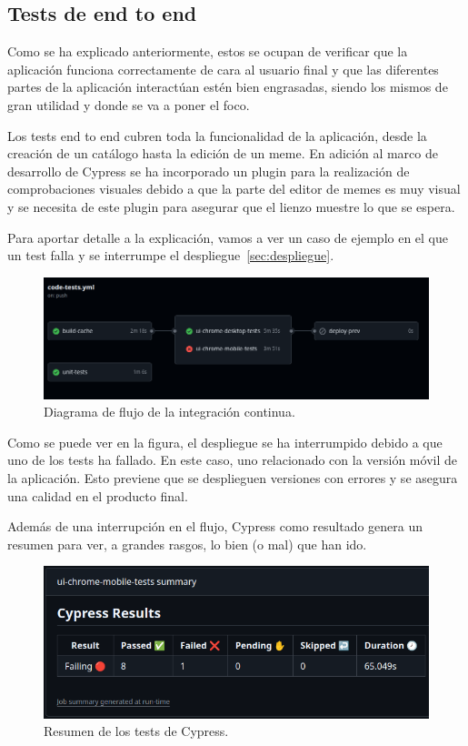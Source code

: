 \subsection{Tests de end to end}

Como se ha explicado anteriormente, estos se ocupan de verificar que la aplicación funciona correctamente de cara al usuario final y que las diferentes partes de la aplicación interactúan estén bien engrasadas, siendo los mismos de gran utilidad y donde se va a poner el foco.

Los tests end to end cubren toda la funcionalidad de la aplicación, desde la creación de un catálogo hasta la edición de un meme. En adición al marco de desarrollo de Cypress se ha incorporado un plugin para la realización de comprobaciones visuales debido a que la parte del editor de memes es muy visual y se necesita de este plugin para asegurar que el lienzo muestre lo que se espera.

Para aportar detalle a la explicación, vamos a ver un caso de ejemplo en el que un test falla y se interrumpe el despliegue~\ref{sec:despliegue}.

\begin{figure}[H]
    \caption{Diagrama de flujo de la integración continua.}
    \centering
    \vspace*{0.5cm}
    \includegraphics[scale=0.35]{figuras/fallo_test_e2e.png}
\end{figure}

Como se puede ver en la figura, el despliegue se ha interrumpido debido a que uno de los tests ha fallado. En este caso, uno relacionado con la versión móvil de la aplicación. Esto previene que se desplieguen versiones con errores y se asegura una calidad en el producto final.

Además de una interrupción en el flujo, Cypress como resultado genera un resumen para ver, a grandes rasgos, lo bien (o mal) que han ido.

\begin{figure}[H]
    \caption{Resumen de los tests de Cypress.}
    \centering
    \vspace*{0.5cm}
    \includegraphics[scale=0.4]{figuras/resumen_cypress_ci.png}
\end{figure}

